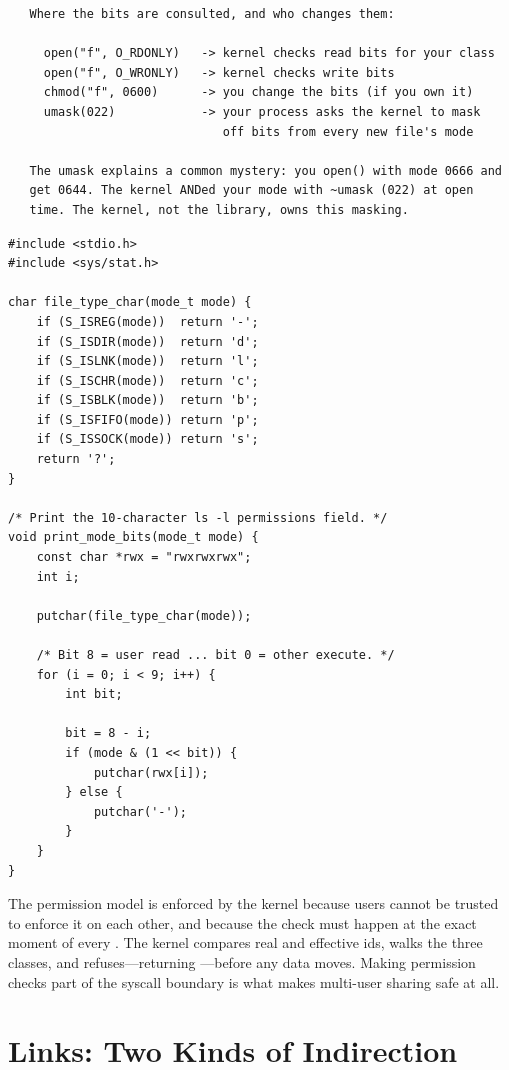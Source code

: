 \begin{verbatim}
   Where the bits are consulted, and who changes them:

     open("f", O_RDONLY)   -> kernel checks read bits for your class
     open("f", O_WRONLY)   -> kernel checks write bits
     chmod("f", 0600)      -> you change the bits (if you own it)
     umask(022)            -> your process asks the kernel to mask
                              off bits from every new file's mode

   The umask explains a common mystery: you open() with mode 0666 and
   get 0644. The kernel ANDed your mode with ~umask (022) at open
   time. The kernel, not the library, owns this masking.
\end{verbatim}

\begin{lstlisting}[caption={Decoding permissions bit by bit, like ls does.}]
#include <stdio.h>
#include <sys/stat.h>

char file_type_char(mode_t mode) {
    if (S_ISREG(mode))  return '-';
    if (S_ISDIR(mode))  return 'd';
    if (S_ISLNK(mode))  return 'l';
    if (S_ISCHR(mode))  return 'c';
    if (S_ISBLK(mode))  return 'b';
    if (S_ISFIFO(mode)) return 'p';
    if (S_ISSOCK(mode)) return 's';
    return '?';
}

/* Print the 10-character ls -l permissions field. */
void print_mode_bits(mode_t mode) {
    const char *rwx = "rwxrwxrwx";
    int i;

    putchar(file_type_char(mode));

    /* Bit 8 = user read ... bit 0 = other execute. */
    for (i = 0; i < 9; i++) {
        int bit;

        bit = 8 - i;
        if (mode & (1 << bit)) {
            putchar(rwx[i]);
        } else {
            putchar('-');
        }
    }
}
\end{lstlisting}

\begin{osconcept}
The permission model is enforced by the kernel because users cannot be
trusted to enforce it on each other, and because the check must happen
at the exact moment of every . The kernel compares real and
effective ids, walks the three classes, and refuses---returning
---before any data moves. Making permission checks part of
the syscall boundary is what makes multi-user sharing safe at all.
\end{osconcept}

\section{Links: Two Kinds of Indirection}

